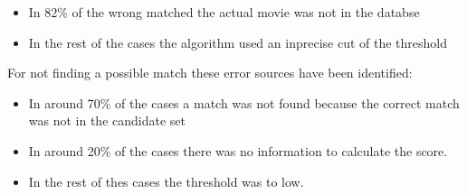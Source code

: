 \begin{itemize}
	\item In 82\% of the wrong matched the actual movie was not in the databse
	\item In the rest of the cases the algorithm used an inprecise cut of the threshold
\end{itemize}

For not finding a possible match these error sources have been identified:

\begin{itemize}
	\item In around 70\% of the cases a match was not found because the correct match was not in the candidate set
	\item In around 20\% of the cases there was no information to calculate the score.
	\item In the rest of thes cases the threshold was to low.
\end{itemize}
